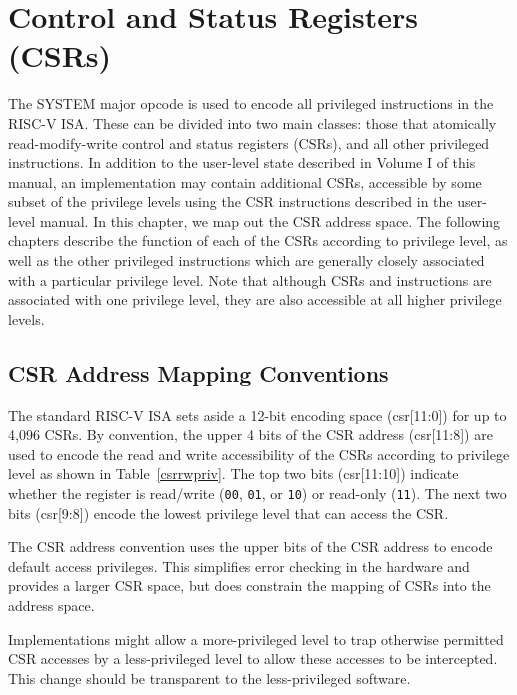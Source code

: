 \chapter{Control and Status Registers (CSRs)}

The SYSTEM major opcode is used to encode all privileged instructions
in the RISC-V ISA.  These can be divided into two main classes: those
that atomically read-modify-write control and status registers (CSRs),
and all other privileged instructions.  In addition to the user-level
state described in Volume I of this manual, an implementation may
contain additional CSRs, accessible by some subset of the privilege
levels using the CSR instructions described in the user-level manual.
In this chapter, we map out the CSR address space.  The following
chapters describe the function of each of the CSRs according to
privilege level, as well as the other privileged instructions which
are generally closely associated with a particular privilege level.
Note that although CSRs and instructions are associated with one
privilege level, they are also accessible at all higher privilege
levels.

\section{CSR Address Mapping Conventions}

The standard RISC-V ISA sets aside a 12-bit encoding space (csr[11:0])
for up to 4,096 CSRs.  By convention, the upper 4 bits of the CSR
address (csr[11:8]) are used to encode the read and write
accessibility of the CSRs according to privilege level as shown in
Table~\ref{csrrwpriv}.  The top two bits (csr[11:10]) indicate whether
the register is read/write ({\tt 00}, {\tt 01}, or {\tt 10}) or
read-only ({\tt 11}).  The next two bits (csr[9:8]) encode the lowest
privilege level that can access the CSR.

\begin{commentary}
The CSR address convention uses the upper bits of the CSR address to
encode default access privileges.  This simplifies error checking in
the hardware and provides a larger CSR space, but does constrain the
mapping of CSRs into the address space.

Implementations might allow a more-privileged level to trap otherwise
permitted CSR accesses by a less-privileged level to allow these
accesses to be intercepted.  This change should be transparent to the
less-privileged software.
\end{commentary}


